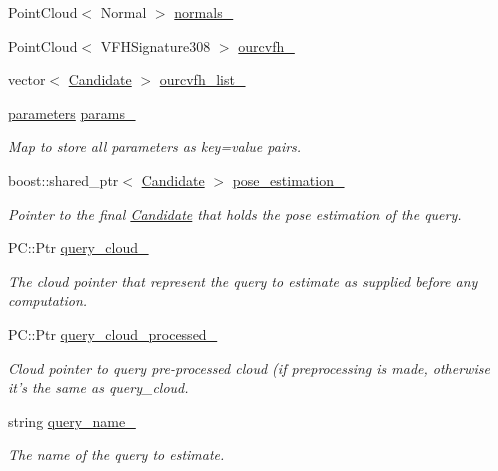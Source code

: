 \begin{DoxyCompactItemize}
Point\-Cloud$<$ Normal $>$ \hyperlink{classPoseEstimation_ab76eba4186b7a9ea862a266133e831f4}{normals\-\_\-}
\item 
Point\-Cloud$<$ V\-F\-H\-Signature308 $>$ \hyperlink{classPoseEstimation_aa817cf97641b997de15fef12a263823f}{ourcvfh\-\_\-}
\item 
vector$<$ \hyperlink{classCandidate}{Candidate} $>$ \hyperlink{classPoseEstimation_a478e06f9c9c3711c26376ce1bcd0ef79}{ourcvfh\-\_\-list\-\_\-}
\item 
\hyperlink{group__Definitions_gacbb28d8f791bb363852e522cf3b83c47}{parameters} \hyperlink{classPoseEstimation_a8e62ef2d3f51413b00e6c91aeeab0bfc}{params\-\_\-}
\begin{DoxyCompactList}\small\item\em Map to store all parameters as key=value pairs. \end{DoxyCompactList}\item 
boost\-::shared\-\_\-ptr$<$ \hyperlink{classCandidate}{Candidate} $>$ \hyperlink{classPoseEstimation_a75dc35326ae05d9b6de34537fe1df943}{pose\-\_\-estimation\-\_\-}
\begin{DoxyCompactList}\small\item\em Pointer to the final \hyperlink{classCandidate}{Candidate} that holds the pose estimation of the query. \end{DoxyCompactList}\item 
P\-C\-::\-Ptr \hyperlink{classPoseEstimation_a624150566f5f26ef20a526dc2580a0c1}{query\-\_\-cloud\-\_\-}
\begin{DoxyCompactList}\small\item\em The cloud pointer that represent the query to estimate as supplied before any computation. \end{DoxyCompactList}\item 
P\-C\-::\-Ptr \hyperlink{classPoseEstimation_a8a08b75a2df62953f533b44cb45c69e3}{query\-\_\-cloud\-\_\-processed\-\_\-}
\begin{DoxyCompactList}\small\item\em Cloud pointer to query pre-\/processed cloud (if preprocessing is made, otherwise it's the same as query\-\_\-cloud. \end{DoxyCompactList}\item 
string \hyperlink{classPoseEstimation_a5dd4cb5c1d202b2c1d5e874902dc31bf}{query\-\_\-name\-\_\-}
\begin{DoxyCompactList}\small\item\em The name of the query to estimate. \end{DoxyCompactList}\item 

\end{DoxyCompactItemize}
